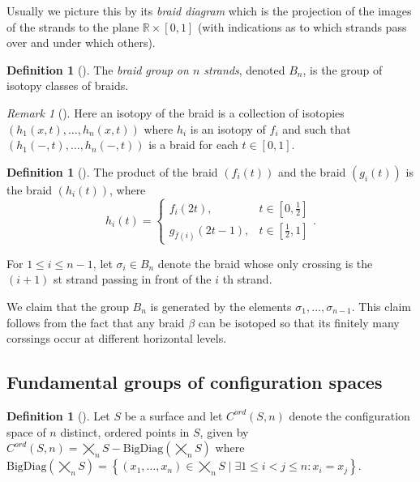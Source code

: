 \documentclass[reqno]{amsart}
\theoremstyle{definition}
\newtheorem{definition}[theorem]{Definition}
\theoremstyle{remark}
\newtheorem*{remark}{Remark}
\begin{document}
Usually we picture
this by its \textit{braid diagram} which is
the projection of the images of the strands to
the plane $\mathbb{R} \times \left[ 0,1 \right] $ (with
indications as to which strands pass over and under which
others).

\begin{definition}[]
    The \textit{braid group on $n$ strands}, denoted
    $B_n$, is the group of isotopy classes of braids.
\end{definition}

\begin{remark}[]
    Here an isotopy of the braid is a collection of isotopies
    $\left( h_1(x,t), \ldots, h_n(x,t) \right) $ where
    $h_i$ is an isotopy of $f_i$ and such that
    $\left( h_1 \left( -,t \right) , \ldots,
    h_n \left( -,t \right) \right) $ is a braid
    for each $t \in \left[ 0,1 \right] $.
\end{remark}

\begin{definition}[]
    The product of the braid $\left( f_i(t) \right) $ and
    the braid  $\left( g_i(t) \right) $ is the
    braid $\left( h_i(t) \right) $, where
    \[
    h_i(t) = 
    \begin{cases}
        f_i(2t),& t \in \left[ 0, \frac{1}{2} \right] \\
        g_{\overline{f}(i)}(2t-1),& t \in \left[ \frac{1}{2},1
        \right] 
    \end{cases}.
    \] 
\end{definition}

For $1 \le i \le n-1$, let
$\sigma_i \in B_n$ denote the braid
whose only crossing is the
$\left( i+1 \right) $ st strand passing in front
of the $i$ th strand.

We claim that the group $B_n$ is generated by
the elements $\sigma_1, \ldots, \sigma_{n-1}$.
This claim follows from the fact that any
braid $\beta$ can be isotoped so that
its finitely many corssings occur at different horizontal levels.

\subsection{Fundamental groups of configuration spaces}

\begin{definition}[]
    Let $S$ be a surface and let $C^{ord}(S,n)$ denote
    the configuration space of $n$ distinct, ordered
    points in $S$, given by
    $C^{ord} (S,n) = 
    \bigtimes_n S - \text{BigDiag}(\bigtimes_n S)$
    where $\text{BigDiag}\left( \bigtimes_n S \right) 
    = \left\{ \left( 
    x_1, \ldots, x_n \right) \in 
\bigtimes_n S  \mid \exists 1 \le i < j \le n \colon
x_i = x_j \right\} $.
\end{definition}
\end{document}
